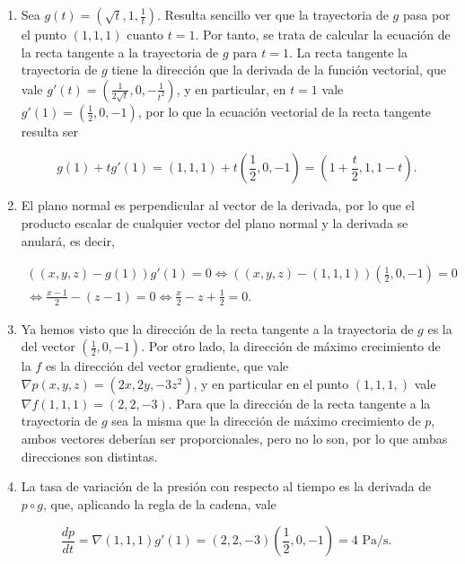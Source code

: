 \documentclass[
  spanish,
  a4paper,
]{scrreport}
\theoremstyle{definition}
\theoremstyle{remark}
\begin{document}
\begin{tcolorbox}[enhanced jigsaw, arc=.35mm, bottomrule=.15mm, bottomtitle=1mm, breakable, colback=white, colbacktitle=quarto-callout-tip-color!10!white, colframe=quarto-callout-tip-color-frame, coltitle=black, left=2mm, leftrule=.75mm, opacityback=0, opacitybacktitle=0.6, rightrule=.15mm, title=\textcolor{quarto-callout-tip-color}{\faLightbulb}\hspace{0.5em}{Solución}, titlerule=0mm, toprule=.15mm, toptitle=1mm]

\begin{enumerate}
\def\labelenumi{\alph{enumi}.}
\item
  Sea \(g(t) = \left(\sqrt{t}, 1, \frac{1}{t}\right)\). Resulta sencillo
  ver que la trayectoria de \(g\) pasa por el punto \((1, 1, 1)\) cuanto
  \(t=1\). Por tanto, se trata de calcular la ecuación de la recta
  tangente a la trayectoria de \(g\) para \(t=1\). La recta tangente la
  trayectoria de \(g\) tiene la dirección que la derivada de la función
  vectorial, que vale
  \(g'(t) = \left(\frac{1}{2\sqrt{t}}, 0, -\frac{1}{t^2}\right)\), y en
  particular, en \(t=1\) vale
  \(g'(1) = \left(\frac{1}{2}, 0, -1\right)\), por lo que la ecuación
  vectorial de la recta tangente resulta ser

  \[
  g(1) + tg'(1) 
  = (1, 1, 1) + t\left(\frac{1}{2}, 0, -1\right)
  = \left(1+\frac{t}{2}, 1, 1-t\right).
  \]
\item
  El plano normal es perpendicular al vector de la derivada, por lo que
  el producto escalar de cualquier vector del plano normal y la derivada
  se anulará, es decir,

  \[
  \begin{gathered}
  ((x, y, z) - g(1)) g'(1) = 0 
  \Leftrightarrow ((x, y, z) - (1, 1, 1)) \left(\frac{1}{2}, 0, -1\right) = 0 \\
  \Leftrightarrow \frac{x-1}{2} -(z-1) = 0
  \Leftrightarrow \frac{x}{2}-z+\frac{1}{2} = 0. 
  \end{gathered}
  \]
\item
  Ya hemos visto que la dirección de la recta tangente a la trayectoria
  de \(g\) es la del vector \(\left(\frac{1}{2}, 0, -1\right)\). Por
  otro lado, la dirección de máximo crecimiento de la \(f\) es la
  dirección del vector gradiente, que vale
  \(\nabla p(x, y, z)= (2x, 2y, -3z^2)\), y en particular en el punto
  \((1, 1, 1,)\) vale \(\nabla f(1, 1, 1) = (2, 2, -3)\). Para que la
  dirección de la recta tangente a la trayectoria de \(g\) sea la misma
  que la dirección de máximo crecimiento de \(p\), ambos vectores
  deberían ser proporcionales, pero no lo son, por lo que ambas
  direcciones son distintas.
\item
  La tasa de variación de la presión con respecto al tiempo es la
  derivada de \(p\circ g\), que, aplicando la regla de la cadena, vale
\end{enumerate}

\[
\frac{dp}{dt} 
= \nabla(1,1,1) g'(1)
= (2, 2, -3) \left(\frac{1}{2},0,-1\right)
= 4 \mbox{ Pa/s}.
\]

\end{tcolorbox}
\end{document}
